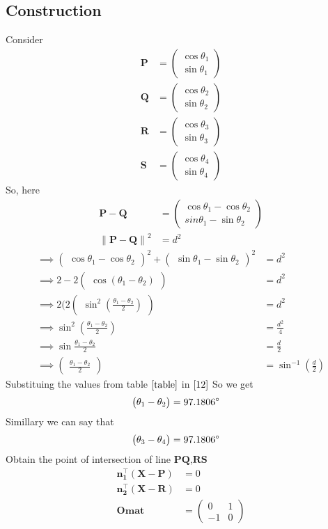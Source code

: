 \documentclass[10pt]{article}
\providecommand{\norm}[1]{\left\lVert#1\right\rVert}
\newcommand{\myvec}[1]{\ensuremath{\begin{pmatrix}#1\end{pmatrix}}}
\let\vec\mathbf
\begin{document}
\begin{enumerate}
\section*{\large Construction}
Consider
\begin{eqnarray}
\vec{P}&=\myvec{\cos \theta_1\\\sin \theta_1}
\\
\vec{Q}&=\myvec{\cos \theta_2\\\sin \theta_2}
\\
\vec{R}&=\myvec{\cos \theta_3\\\sin \theta_3}
\\
\vec{S}&=\myvec{\cos \theta_4\\\sin \theta_4}
\end{eqnarray}\label{table1}
So, here
\begin{align}
	\vec{P}-\vec{Q}&=\myvec{\cos\theta_1-\cos\theta_2\\{sin \theta_1}-{\sin \theta_2}}
	\\
\norm{\vec{P}-\vec{Q}}^2&=d^2
\end{align}
		\begin{align}
	\implies\myvec{\cos \theta_1-\cos \theta_2}^2+\myvec{\sin \theta_1-\sin \theta_2}^2&=d^2\\
	\implies2-2\myvec{\cos(\theta_1-\theta_2)}&=d^2\\
	\implies2(2\myvec{{\sin^2}(\frac{\theta_1-\theta_2}{2})}&=d^2\\
	\implies\sin^2(\frac{\theta_1-\theta_2}{2})&=\frac{d^2}{4}\\
	\implies\sin\frac{\theta_1-\theta_2}{2}&=\frac{d}{2}\\
\implies\myvec{\frac{\theta_1-\theta_2}{2}}&=\sin^{-1}(\frac{d}{2})\label{12}
	\end{align}
	Substituing the values from table $\eqref{table}$ in $\eqref{12}$ So we get
	\begin{align}
	\myvec{\theta_1-\theta_2}&=97.1806\degree
	\end{align}
Simillary we can say that
\begin{align}
	\myvec{\theta_3-\theta_4}&=97.1806\degree 		       
\end{align}
Obtain the point of intersection of line $\vec{PQ}$,$\vec{RS}$
\begin{align}
\vec{{n}_1^{\top}}(\vec{X}-\vec{P})&=0\\
\vec{{n}_2^{\top}}(\vec{X}-\vec{R})&=0\\
\vec{Omat}&=\myvec{0&1\\-1&0}\\

\end{align}
\end{enumerate}
\end{document}
